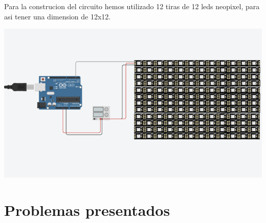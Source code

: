 \documentclass{article}
\begin{document}
Para la construcion del circuito hemos utilizado 12 tiras de 12 leds neopixel, para asi tener una dimension de 12x12.

\includegraphics{images/Circuito.png}

\section{Problemas presentados}
\end{document}
